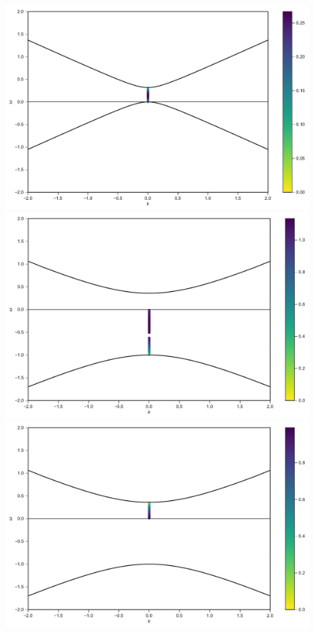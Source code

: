 \documentclass[%
preprint,
 amsmath,amssymb,
 aps,
 prd
]{revtex4-1}
\begin{document}
\begin{figure}[!htb]
  \includegraphics[width=\linewidth]{assets/spectDBWC1DRDBMAAPlt.pdf}
\endminipage\hfill
{}
  \includegraphics[width=\linewidth]{assets/spectDBWC1DRDBMZApPlt.pdf}
\endminipage\hfill
{}%
  \includegraphics[width=\linewidth]{assets/spectDBWC1DRDBMZAmPlt.pdf}

\end{figure}
\end{document}
